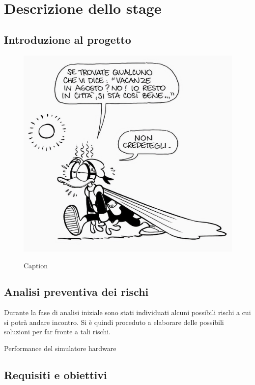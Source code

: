 \chapter{Descrizione dello stage}
\label{chap:descrizione-stage}

\section{Introduzione al progetto}
\begin{figure}[H] 
    \centering 
    \includegraphics[alt={Testo alternativo dell'immagine}, width=0.5\columnwidth]{img/pk_estate.jpeg}
    \caption{Caption}
    \label{fig:pk_estate}
\end{figure}
\lipsum[1]

\section{Analisi preventiva dei rischi}

Durante la fase di analisi iniziale sono stati individuati alcuni possibili rischi a cui si potrà andare incontro.
Si è quindi proceduto a elaborare delle possibili soluzioni per far fronte a tali rischi.

\begin{risk}{Performance del simulatore hardware}
    \label{risk:hardware-simulator} 
\end{risk}

\section{Requisiti e obiettivi}

